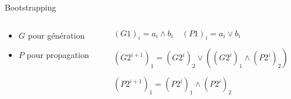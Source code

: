\documentclass[10pt,xcolor={usenames,dvipsnames}]{beamer}
\begin{document}
\begin{section}{Bootstrapping}
\begin{frame}
\begin{columns}
\begin{column}{0.4\textwidth}
\begin{itemize}
\item $G$ pour génération
  \begin{figure}
    \begin{center}
      \begin{tikzpicture}[scale = 0.6, transform shape]
      	
      \end{tikzpicture}
    \end{center}
  \end{figure}
\item $P$ pour propagation
  \begin{figure}
    \begin{center}
      \begin{tikzpicture}[scale = 0.6, transform shape]
      	
      \end{tikzpicture}
    \end{center}
  \end{figure}
\end{itemize}
\end{column}

\begin{column}{0.6\textwidth}  %
\pause


$(G1)_i = a_i \wedge b_i \quad (P1)_i = a_i \vee b_i$
\pause

  \begin{figure}
    \begin{center}
      \begin{tikzpicture}[scale = 0.9, transform shape]
      	
      \end{tikzpicture}
    \end{center}
  \end{figure}

${(G2^{i+1})}_1 = {(G2^i)}_2 \vee \left ( {(G2^i)}_1 \wedge {(P2^i)}_2 \right)$\\

\vspace{0.3cm}

${(P2^{i+1})}_1 = {(P2^i)}_1 \wedge {(P2^i)}_2$

\end{column}
\end{columns}


\end{frame}
\end{section}
\end{document}

